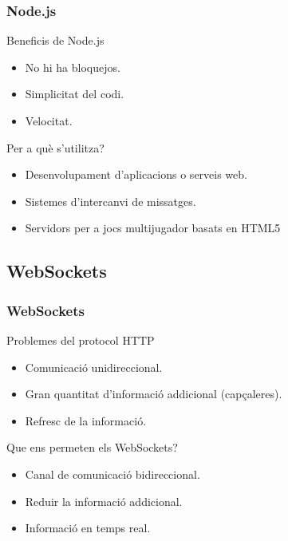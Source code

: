 \documentclass[notitlepage]{beamer}
\begin{document}
\begin{frame}
\frametitle{Node.js}
\begin{block}{Beneficis de Node.js}
\begin{itemize}
    \item{No hi ha bloquejos.}
    \item{Simplicitat del codi.}
    \item{Velocitat.}
\end{itemize}
\end{block}
\begin{block}{Per a què s'utilitza?}
\begin{itemize}
    \item{Desenvolupament d'aplicacions o serveis web.}
    \item{Sistemes d'intercanvi de missatges.}
    \item{Servidors per a jocs multijugador basats en HTML5}
\end{itemize}
\end{block}

\end{frame}

\subsection{WebSockets}
\begin{frame}
\frametitle{WebSockets}
\begin{block}{Problemes del protocol HTTP}
\begin{itemize}
    \item{Comunicació unidireccional.}
    \item{Gran quantitat d'informació addicional (capçaleres).}
    \item{Refresc de la informació.}
\end{itemize}
\end{block}

\begin{block}{Que ens permeten els WebSockets?}
\begin{itemize}
   \item{Canal de comunicació bidireccional.}
    \item{Reduir la informació addicional.}
    \item{Informació en temps real.}
\end{itemize}
\end{block}
\end{frame}
\end{document}
